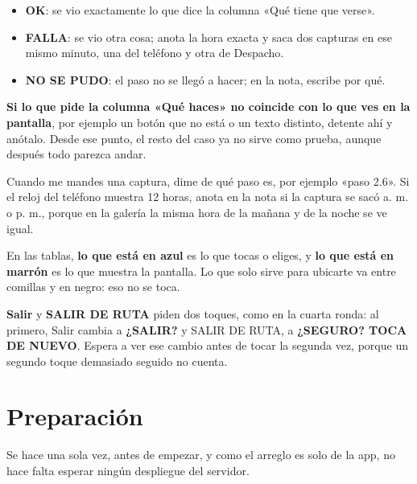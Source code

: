 \documentclass[10pt,a4paper]{article}
\newcommand{\toca}[1]{\textcolor{azul}{\textbf{#1}}}
\newcommand{\pantalla}[1]{\textcolor{marron}{\textbf{#1}}}
\begin{document}
\begin{Form}
\begin{itemize}
  \item \textbf{OK}: se vio exactamente lo que dice la columna «Qué tiene que verse».
  \item \textbf{FALLA}: se vio otra cosa; anota la hora exacta y saca dos capturas en ese mismo minuto, una del teléfono y otra de Despacho.
  \item \textbf{NO SE PUDO}: el paso no se llegó a hacer; en la nota, escribe por qué.
\end{itemize}

\begin{alto}
\textbf{Si lo que pide la columna «Qué haces» no coincide con lo que ves en la pantalla}, por ejemplo un botón que no está o un texto distinto, detente ahí y anótalo. Desde ese punto, el resto del caso ya no sirve como prueba, aunque después todo parezca andar.
\end{alto}

Cuando me mandes una captura, dime de qué paso es, por ejemplo «paso 2.6». Si el reloj del teléfono muestra 12 horas, anota en la nota si la captura se sacó a. m. o p. m., porque en la galería la misma hora de la mañana y de la noche se ve igual.

En las tablas, \toca{lo que está en azul} es lo que tocas o eliges, y \pantalla{lo que está en marrón} es lo que muestra la pantalla. Lo que solo sirve para ubicarte va entre comillas y en negro: eso no se toca.

\toca{Salir} y \toca{SALIR DE RUTA} piden dos toques, como en la cuarta ronda: al primero, Salir cambia a \pantalla{¿SALIR?} y SALIR DE RUTA, a \pantalla{¿SEGURO? TOCA DE NUEVO}. Espera a ver ese cambio antes de tocar la segunda vez, porque un segundo toque demasiado seguido no cuenta.

\section{Preparación}

Se hace una sola vez, antes de empezar, y como el arreglo es solo de la app, no hace falta esperar ningún despliegue del servidor.


\end{Form}
\end{document}
